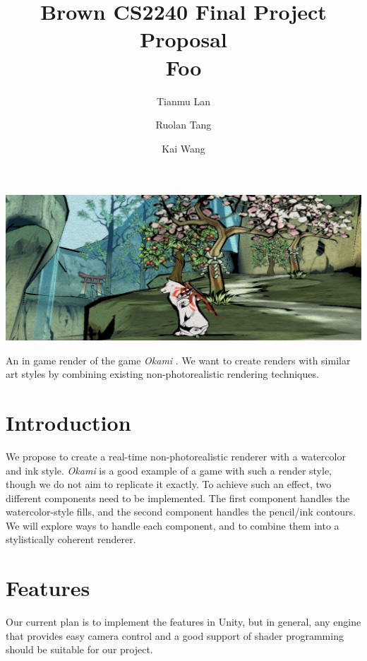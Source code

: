 \documentclass[acmtog, table, dvipsnames]{acmart}
\begin{document}
\title{\textbf{Brown CS2240 Final Project Proposal} \\
       Foo}
\author{Tianmu Lan}
\author{Ruolan Tang}
\author{Kai Wang}
\begin{teaserfigure}
  \centering
  \includegraphics[width=\linewidth]{okami.jpg}
  \caption{An in game render of the game \textit{Okami} \cite{Okami}. We want to create renders with similar art styles by combining existing non-photorealistic rendering techniques.}
\end{teaserfigure}

\maketitle

\section{Introduction}

We propose to create a real-time non-photorealistic renderer with a watercolor and ink style. \textit{Okami} \cite{Okami} is a good example of a game with such a render style, though we do not aim to replicate it exactly. To achieve such an effect, two different components need to be implemented. The first component handles the watercolor-style fills, and the second component handles the pencil/ink contours. We will explore ways to handle each component, and to combine them into a stylistically coherent renderer. 

\section{Features}
Our current plan is to implement the features in Unity, but in general, any engine that provides easy camera control and a good support of shader programming should be suitable for our project.
\end{document}

